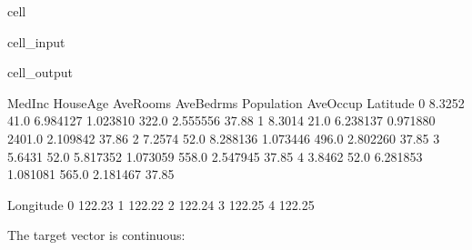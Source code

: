 \documentclass[letterpaper,10pt,english]{jupyterBook}
\begin{document}
\begin{sphinxuseclass}{cell}\begin{sphinxVerbatimInput}

\begin{sphinxuseclass}{cell_input}
\begin{sphinxVerbatim}[commandchars=\\\{\}]
   
  
\end{sphinxVerbatim}

\end{sphinxuseclass}\end{sphinxVerbatimInput}
\begin{sphinxVerbatimOutput}

\begin{sphinxuseclass}{cell_output}
\begin{sphinxVerbatim}[commandchars=\\\{\}]
   MedInc  HouseAge  AveRooms  AveBedrms  Population  AveOccup  Latitude  \PYGZbs{}
0  8.3252      41.0  6.984127   1.023810       322.0  2.555556     37.88   
1  8.3014      21.0  6.238137   0.971880      2401.0  2.109842     37.86   
2  7.2574      52.0  8.288136   1.073446       496.0  2.802260     37.85   
3  5.6431      52.0  5.817352   1.073059       558.0  2.547945     37.85   
4  3.8462      52.0  6.281853   1.081081       565.0  2.181467     37.85   

   Longitude  
0    \PYGZhy{}122.23  
1    \PYGZhy{}122.22  
2    \PYGZhy{}122.24  
3    \PYGZhy{}122.25  
4    \PYGZhy{}122.25  
\end{sphinxVerbatim}

\end{sphinxuseclass}\end{sphinxVerbatimOutput}

\end{sphinxuseclass}
\sphinxAtStartPar
The target vector is continuous:
\end{document}
